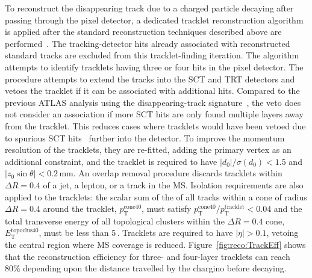 To reconstruct the disappearing track due to a charged particle decaying after passing through the pixel detector, a dedicated tracklet reconstruction algorithm is applied after the standard reconstruction techniques described above are performed~\cite{ATL-PHYS-PUB-2019-011}. The tracking-detector hits already associated with reconstructed standard tracks are excluded from this tracklet-finding iteration. The algorithm attempts to identify tracklets having three or four hits in the pixel detector. The procedure attempts to extend the tracks into the SCT and TRT detectors and vetoes the tracklet if it can be associated with additional hits. Compared to the previous ATLAS analysis using the disappearing-track signature~\cite{SUSY-2018-19}, the veto does not consider an association if more SCT hits are only found multiple layers away from the tracklet. This reduces cases where tracklets would have been vetoed due to spurious SCT hits~\cite{ATL-PHYS-PUB-2019-011} further into the detector. To improve the momentum resolution of the tracklets, they are re-fitted, adding the primary vertex as an additional constraint, and the tracklet is required to have $|d_0|/\sigma(d_0) < 1.5$ and $|z_0\sin\theta|< 0.2$\,mm. An overlap removal procedure discards tracklets within $\Delta R = 0.4$ of a jet, a lepton, or a track in the MS. Isolation requirements are also applied to the tracklets: the scalar sum of the \pt of all tracks within a cone of radius $\Delta R=0.4$ around the tracklet, $p_{\mathrm{T}}^{\mathrm{cone40}}$, must satisfy $p_{\mathrm{T}}^{\mathrm{cone40}}/p_{\mathrm{T}}^{\mathrm{tracklet}} < 0.04$ and the total transverse energy of all topological clusters within the $\Delta R=0.4$ cone, $E_{\mathrm{T}}^{\mathrm{topoclus40}}$, must be less than 5\,\GeV. Tracklets are required to have $|\eta| > 0.1$, vetoing the central region where MS coverage is reduced. Figure~\ref{fig:reco:TrackEff} shows that the reconstruction efficiency for three- and four-layer tracklets can reach 80\% depending upon the distance travelled by the chargino before decaying. 

